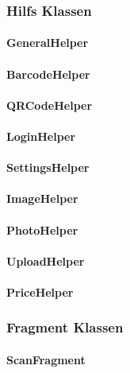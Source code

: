 \documentclass{scrartcl}
\begin{document}
\subsubsection{Hilfs Klassen}

\paragraph{GeneralHelper}

\paragraph{BarcodeHelper}

\paragraph{QRCodeHelper}

\paragraph{LoginHelper}

\paragraph{SettingsHelper}

\paragraph{ImageHelper}

\paragraph{PhotoHelper}

\paragraph{UploadHelper}

\paragraph{PriceHelper}

\subsubsection{Fragment Klassen}

\paragraph{ScanFragment}
\end{document}
